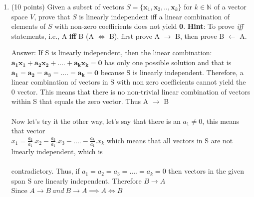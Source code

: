 \documentclass{article}%
\begin{document}
\begin{enumerate}
    
    \item (10 points) Given a subset of vectors $S = \{\mathbf{x}_1,\mathbf{x}_2,..,\mathbf{x}_k\}$ for $k \in \mathbb{N}$ of a vector space $V$, prove that $S$ is linearly independent iff a linear combination of elements of $S$ with non-zero coefficients does not yield \textbf{0}. \textbf{Hint}: To prove \textit{iff} statements, i.e., A \textbf{iff} B (A $\iff$ B), first prove A $\rightarrow$ B, then prove B $\leftarrow$ A.


    Answer: If S is linearly independent, then the linear combination: $\mathbf{ a_1x_1 + a_2x_2 + .... + a_kx_k = 0 }$ has only one possible solution and that is $\mathbf{ a_1 = a_2 = a_3 = .... = a_k = 0 }$ because S is linearly independent. Therefore, a linear combination of vectors in S with non zero coefficients cannot yield the 0 vector. This means that there is no non-trivial linear combination of vectors within S that equals the zero vector. Thus A $ \rightarrow $  B \\ \\
    Now let's try it the other way, let's say that there is an $a_1 \neq 0$, this means that vector \\ $x_1 = \frac{a_2}{a_1}.x_2 - \frac{a_3}{a_1}.x_3 - .... - \frac{a_k}{a_1}.x_k$ which means that all vectors in S are not linearly independent, which is \\ \\ contradictory. Thus, if $a_1 = a_2 = a_3 = .... = a_k = 0$ then vectors in the given span S are linearly independent. Therefore $B \rightarrow A$ \\
    Since $ A \rightarrow B \ and \ B \rightarrow A \implies A \iff B $



\end{enumerate}
\end{document}
